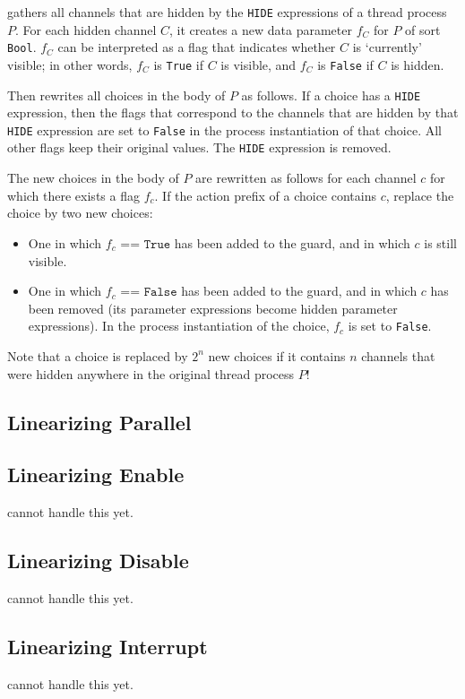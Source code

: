 \lpeq{} gathers all channels that are hidden by the \texttt{HIDE} expressions of a thread process $P$.
For each hidden channel $C$, it creates a new data parameter $f_C$ for $P$ of sort \texttt{Bool}.
$f_C$ can be interpreted as a flag that indicates whether $C$ is `currently' visible; in other words, $f_C$ is \texttt{True} if $C$ is visible, and $f_C$ is \texttt{False} if $C$ is hidden.

Then \lpeq{} rewrites all choices in the body of $P$ as follows.
If a choice has a \texttt{HIDE} expression, then the flags that correspond to the channels that are hidden by that \texttt{HIDE} expression are set to \texttt{False} in the process instantiation of that choice.
All other flags keep their original values.
The \texttt{HIDE} expression is removed.

The new choices in the body of $P$ are rewritten as follows for each channel $c$ for which there exists a flag $f_c$.
If the action prefix of a choice contains $c$, replace the choice by two new choices:
\begin{itemize}
\item One in which $f_c \texttt{ == True}$ has been added to the guard, and in which $c$ is still visible.
\item One in which $f_c \texttt{ == False}$ has been added to the guard, and in which $c$ has been removed (its parameter expressions become hidden parameter expressions).
In the process instantiation of the choice, $f_c$ is set to \texttt{False}.
\end{itemize}
Note that a choice is replaced by $2^n$ new choices if it contains $n$ channels that were hidden anywhere in the original thread process $P$!

\subsection{Linearizing Parallel}



\subsection{Linearizing Enable}

\lpeq{} cannot handle this yet.

\subsection{Linearizing Disable}

\lpeq{} cannot handle this yet.

\subsection{Linearizing Interrupt}

\lpeq{} cannot handle this yet.


